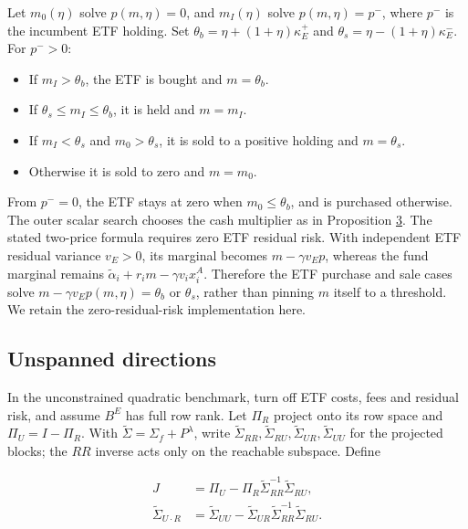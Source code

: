 \documentclass[11pt]{article}
\begin{document}
Let \(m_0(\eta)\) solve \(p(m,\eta)=0\), and \(m_I(\eta)\) solve \(p(m,\eta)=p^-\), where \(p^-\) is the incumbent ETF holding. Set \(\theta_b=\eta+(1+\eta)\kappa_E^+\) and \(\theta_s=\eta-(1+\eta)\kappa_E^-\). For \(p^->0\):

\begin{itemize}
  \item If \(m_I>\theta_b\), the ETF is bought and \(m=\theta_b\).
  \item If \(\theta_s\leq m_I\leq\theta_b\), it is held and \(m=m_I\).
  \item If \(m_I<\theta_s\) and \(m_0>\theta_s\), it is sold to a positive holding and \(m=\theta_s\).
  \item Otherwise it is sold to zero and \(m=m_0\).
\end{itemize}

From \(p^-=0\), the ETF stays at zero when \(m_0\leq\theta_b\), and is purchased otherwise. The outer scalar search chooses the cash multiplier as in Proposition \hyperref[res:Proposition-3]{3}. The stated two-price formula requires zero ETF residual risk. With independent ETF residual variance \(v_E>0\), its marginal becomes \(m-\gamma v_Ep\), whereas the fund marginal remains \(\tilde\alpha_i+r_i m-\gamma v_i x_i^A\). Therefore the ETF purchase and sale cases solve \(m-\gamma v_Ep(m,\eta)=\theta_b\) or \(\theta_s\), rather than pinning \(m\) itself to a threshold. We retain the zero-residual-risk implementation here.

\subsection{Unspanned directions}\label{sec:B.2}

In the unconstrained quadratic benchmark, turn off ETF costs, fees and residual risk, and assume \(B^E\) has full row rank. Let \(\Pi_R\) project onto its row space and \(\Pi_U=I-\Pi_R\). With \(\tilde\Sigma=\Sigma_f+P^\lambda\), write \(\tilde\Sigma_{RR},\tilde\Sigma_{RU},\tilde\Sigma_{UR},\tilde\Sigma_{UU}\) for the projected blocks; the \(RR\) inverse acts only on the reachable subspace. Define

\begin{equation*}
\begin{aligned}
J&=\Pi_U-\Pi_R\tilde\Sigma_{RR}^{-1}\tilde\Sigma_{RU},\\
\tilde\Sigma_{U\cdot R}&=\tilde\Sigma_{UU}-\tilde\Sigma_{UR}\tilde\Sigma_{RR}^{-1}\tilde\Sigma_{RU}.
\end{aligned}
\tag{31}\label{eq:31}
\end{equation*}
\end{document}
